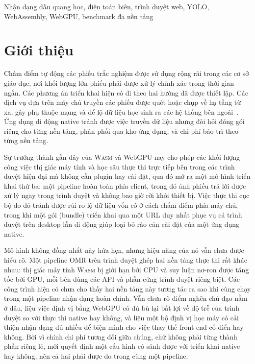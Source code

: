 \documentclass[conference]{IEEEtran}
\newcommand{\wasm}{\textnormal{\textsc{Wasm}}}
\begin{document}
\begin{IEEEkeywords}
Nhận dạng dấu quang học, điện toán biên, trình duyệt web, YOLO,
WebAssembly, WebGPU, benchmark đa nền tảng
\end{IEEEkeywords}

\section{Giới thiệu}

Chấm điểm tự động các phiếu trắc nghiệm được sử dụng rộng rãi trong các cơ sở
giáo dục, nơi khối lượng lớn phiếu phải được xử lý chính xác trong thời gian
ngắn. Các phương án triển khai hiện có đi theo hai hướng đã được thiết lập. Các
dịch vụ dựa trên máy chủ truyền các phiếu được quét hoặc chụp về hạ tầng từ xa,
gây phụ thuộc mạng và để lộ dữ liệu học sinh ra các hệ thống bên
ngoài~\cite{patel2015,okorie2022}. Ứng dụng di động native tránh được việc truyền
dữ liệu nhưng đòi hỏi đóng gói riêng cho từng nền tảng, phân phối qua kho ứng
dụng, và chi phí bảo trì theo từng nền tảng.

Sự trưởng thành gần đây của \wasm{} và WebGPU nay cho phép các khối lượng công
việc thị giác máy tính và học sâu thực thi trực tiếp bên trong các trình duyệt
hiện đại mà không cần plugin hay cài đặt, qua đó mở ra một mô hình triển khai thứ
ba: một pipeline hoàn toàn phía client, trong đó ảnh phiếu trả lời được xử lý
ngay trong trình duyệt và không bao giờ rời khỏi thiết bị. Việc thực thi cục bộ
do đó tránh được rủi ro lộ dữ liệu vốn có ở cách chấm điểm phía máy chủ, trong
khi một gói (bundle) triển khai qua một URL duy nhất phục vụ cả trình duyệt trên
desktop lẫn di động giúp loại bỏ rào cản cài đặt của một ứng dụng native.

Mô hình không đồng nhất này hứa hẹn, nhưng hiệu năng của nó vẫn chưa được hiểu
rõ. Một pipeline OMR trên trình duyệt ghép hai nền tảng thực thi rất khác nhau:
thị giác máy tính \wasm{} bị giới hạn bởi CPU và suy luận nơ-ron được tăng tốc
bởi GPU, mỗi bên dùng các API và phần cứng trình duyệt riêng biệt. Các công trình
hiện có chưa cho thấy hai nền tảng này tương tác ra sao khi cùng chạy trong một
pipeline nhận dạng hoàn chỉnh. Vẫn chưa rõ điểm nghẽn chủ đạo nằm ở đâu, liệu
việc định vị bằng WebGPU có đủ bù lại bất lợi về độ trễ của trình duyệt so với
thực thi native hay không, và liệu một bộ định vị học máy có cải thiện nhận dạng
đủ nhiều để biện minh cho việc thay thế front-end cổ điển hay không. Bởi vì chính
chi phí tương đối giữa chúng, chứ không phải từng thành phần riêng lẻ, mới quyết
định một cấu hình có sánh được với triển khai native hay không, nên cả hai phải
được đo trong cùng một pipeline.
\end{document}
